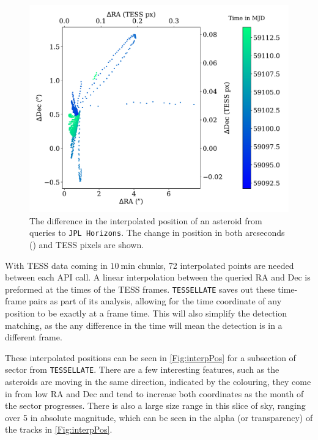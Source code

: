 \documentclass{UCreport}
\begin{document}
\begin{figure}[t]
  \centering
  \includegraphics[width =0.8 \textwidth]{./Figures/1990 KC1PosCheck.pdf} %
  \caption[Interpolated Position Verification]{
    The difference in the interpolated position of an asteroid from queries to \texttt{JPL Horizons}.
    The change in position in both arcseconds (\unit{\arcsec}) and TESS pixels are shown.
  }\label{Fig:errPos}
\end{figure}

With TESS data coming in $\qty{10}{\minute}$ chunks, 72 interpolated points are needed between each API call.
A linear interpolation between the queried RA and Dec is preformed at the times of the TESS frames.
\texttt{TESSELLATE} saves out these time-frame pairs as part of its analysis, allowing for the time coordinate of any position to be exactly at a frame time.
This will also simplify the detection matching, as the any difference in the time will mean the detection is in a different frame.

These interpolated positions can be seen in \autoref{Fig:interpPos} for a subsection of sector from \texttt{TESSELLATE}.
There are a few interesting features, such as the asteroids are moving in the same direction, indicated by the colouring, they come in from low RA and Dec and tend to increase both coordinates as the month of the sector progresses.
There is also a large size range in this slice of sky, ranging over \qty{5}{\mag} in absolute magnitude, which can be seen in the alpha (or transparency) of the tracks in \autoref{Fig:interpPos}.
\end{document}
